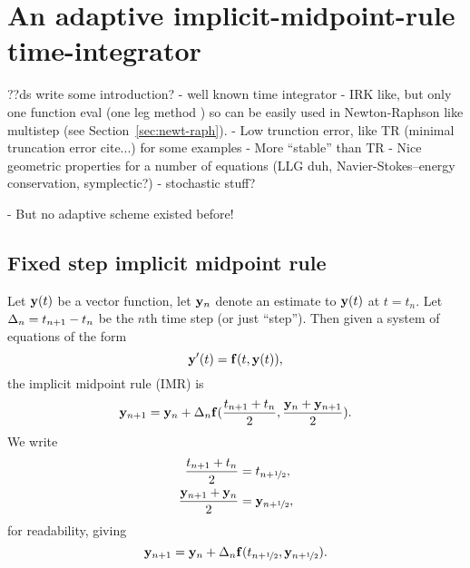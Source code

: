 

\chapter{An adaptive implicit-midpoint-rule time-integrator}
\label{sec:adaptive-imr}

??ds write some introduction?
- well known time integrator
- IRK like\cite{somewhere in hairer?}, but only one function eval (one leg method \cite{somewhere in hairer?}) so can be easily used in Newton-Raphson like multistep (see Section~\ref{sec:newt-raph}).
- Low trunction error, like TR (minimal truncation error cite...) for some examples
- More ``stable'' than TR
- Nice geometric properties for a number of equations (LLG duh, Navier-Stokes--energy conservation\cite{wind farms thesis}, symplectic?)
- stochastic stuff?

- But no adaptive scheme existed before!



\section{Fixed step implicit midpoint rule}

Let $\mathbf{y}(t)$ be a vector function, let $\mathbf{y}_n$ denote an estimate to $\mathbf{y}(t)$ at $t = t_n$.
Let $\Delta_{n} = t_{n+1} - t_n$ be the $n$th time step (or just ``step'').
Then given a system of equations of the form
\begin{equation}
  \mathbf{y}'(t) = {\mathbf{f}}(t, \mathbf{y}(t)),
  \label{eq:43}
\end{equation}
the implicit midpoint rule (IMR) is
\begin{equation}
    \mathbf{y}_{n+1} = \mathbf{y}_n + \Delta_{n} {\mathbf{f}}(\frac{t_{n+1} + t_n}{2}, \frac{\mathbf{y}_n + \mathbf{y}_{n+1}}{2}).
    \notag
\end{equation}
We write
\begin{equation}
  \begin{aligned}
    \frac{t_{n+1} + t_n}{2} &= t_{n+\nicefrac{1}{2}}, \\
    \frac{\mathbf{y}_{n+1} + \mathbf{y}_n}{2} &= \mathbf{y}_{n+\nicefrac{1}{2}},
  \end{aligned}
\end{equation}
for readability, giving
\begin{equation}
  \mathbf{y}_{n+1} = \mathbf{y}_n + \Delta_{n} {\mathbf{f}}(t_{n+\nicefrac{1}{2}}, \mathbf{y}_{n+\nicefrac{1}{2}}).
  \label{eq:basic-midpoint}
\end{equation}

